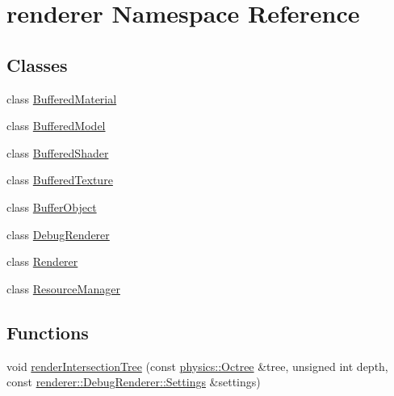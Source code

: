 \hypertarget{namespacerenderer}{\section{renderer Namespace Reference}
\label{namespacerenderer}
}
\subsection*{Classes}
\begin{DoxyCompactItemize}
\item 
class \hyperlink{classrenderer_1_1BufferedMaterial}{Buffered\-Material}
\item 
class \hyperlink{classrenderer_1_1BufferedModel}{Buffered\-Model}
\item 
class \hyperlink{classrenderer_1_1BufferedShader}{Buffered\-Shader}
\item 
class \hyperlink{classrenderer_1_1BufferedTexture}{Buffered\-Texture}
\item 
class \hyperlink{classrenderer_1_1BufferObject}{Buffer\-Object}
\item 
class \hyperlink{classrenderer_1_1DebugRenderer}{Debug\-Renderer}
\item 
class \hyperlink{classrenderer_1_1Renderer}{Renderer}
\item 
class \hyperlink{classrenderer_1_1ResourceManager}{Resource\-Manager}
\end{DoxyCompactItemize}
\subsection*{Functions}
\begin{DoxyCompactItemize}
\item 
void \hyperlink{namespacerenderer_ad2523ebc7f058dd60f1a62a8aabbebbd}{render\-Intersection\-Tree} (const \hyperlink{namespacephysics_a8031fb56deaac8c62e513678eb1ec44f}{physics\-::\-Octree} \&tree, unsigned int depth, const \hyperlink{structrenderer_1_1DebugRenderer_1_1Settings}{renderer\-::\-Debug\-Renderer\-::\-Settings} \&settings)
\end{DoxyCompactItemize}


